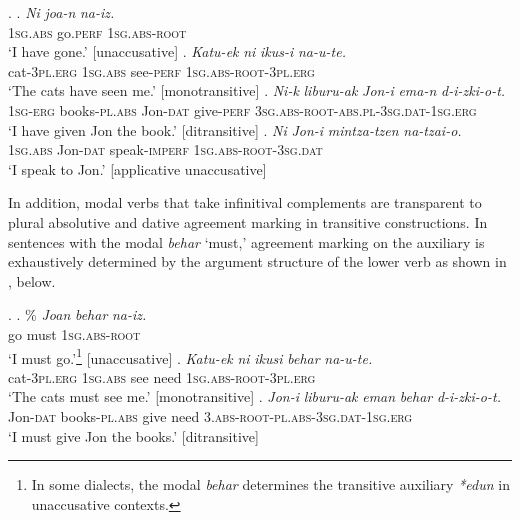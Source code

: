 \documentclass[output=paper]{langscibook}
\begin{document}
\ex. \label{agreement} \ag. \textit{Ni} \textit{joa-n} \textit{na-iz.}\\	
	     \textsc{1sg.abs} go.\textsc{perf} \textsc{1sg.abs-root}\\
	     `I have gone.'  \hfill{[unaccusative]}
	  \bg. \textit{Katu-ek} \textit{ni} \textit{ikus-i} \textit{na-u-te.}\\	
	      cat-\textsc{3pl.erg} \textsc{1sg.abs} see-\textsc{perf} \textsc{1sg.abs-root}-\textsc{3pl.erg}\\
           `The cats have seen me.' \hfill{[monotransitive]}
         \cg. \textit{Ni-k} \textit{liburu-ak} \textit{Jon-i} \textit{ema-n} \textit{d-i-zki-o-t.}\\	
	      \textsc{1sg-erg} books-\textsc{pl.abs} Jon-\textsc{dat} give-\textsc{perf} \textsc{3sg.abs-root-abs.pl}-\textsc{3sg.dat}-\textsc{1sg.erg} \\
           `I have given Jon the book.'  \hfill{[ditransitive]}
         \dg. \textit{Ni} \textit{Jon-i} \textit{mintza-tzen} \textit{na-tzai-o.}\\	
		\textsc{1sg.abs} Jon-\textsc{dat} speak-\textsc{imperf} \textsc{1sg.abs-root}-\textsc{3sg.dat}   \\
		`I speak to Jon.'   \hfill{[applicative unaccusative]}


In addition, modal verbs that take infinitival complements are transparent to plural absolutive and dative agreement marking in transitive constructions.  In sentences with the modal \textit{behar} `must,'  agreement marking on the auxiliary is exhaustively determined by the argument structure of the lower verb as shown in \Next, below.  

\ex. 	\ag. \% \textit{Joan} \textit{behar}   \textit{na-iz.}	\\						
    go    must   \textsc{1sg.abs-root}\\
    `I must go.'\footnote{In some dialects, the modal \textit{behar} determines the transitive auxiliary \textit{*edun} in unaccusative contexts.}   \hfill{[unaccusative]}
    \bg. \textit{Katu-ek} \textit{ni} \textit{ikusi} \textit{behar} \textit{na-u-te.}\\	
	      cat-\textsc{3pl.erg} \textsc{1sg.abs} see need \textsc{1sg.abs-root}-\textsc{3pl.erg}\\
           `The cats must see me.' \hfill{[monotransitive]}
\cg. \textit{Jon-i}       \textit{liburu-ak}       \textit{eman} \textit{behar}   \textit{d-i-zki-o-t.}			\\
    Jon-\textsc{dat} books-\textsc{pl.abs}  give    need  \textsc{3.abs-root-pl.abs-3sg.dat-1sg.erg}  \\
    `I must give Jon the books.'   \hfill{[ditransitive]}
\end{document}
